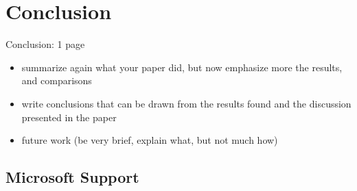 \chapter{Conclusion}

Conclusion: 1 page 

\begin{itemize}
\item summarize again what your paper did, but now emphasize more the results, and comparisons
\item write conclusions that can be drawn from the results found and the discussion presented in the paper
\item future work (be very brief, explain what, but not much how) 
\end{itemize}

\section{Microsoft Support}
